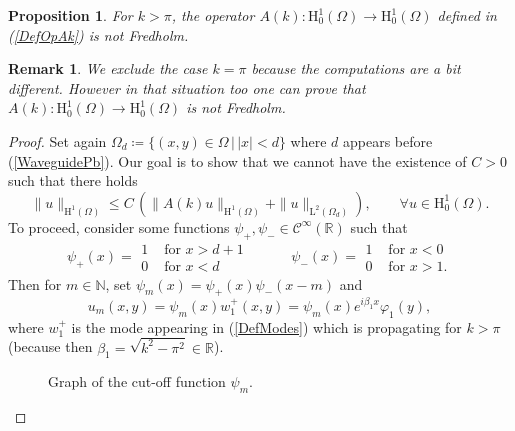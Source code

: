 \documentclass[11pt,a4paper]{report}
\newcommand{\Om}{\Omega}
\newcommand{\mrm}[1]{\mathrm{#1}}
\newcommand{\N}{\mathbb{N}}
\newcommand{\R}{\mathbb{R}}
\newcommand{\mL}{\mrm{L}}
\newcommand{\mH}{\mrm{H}}
\newtheorem{remark}[theorem]{Remark}
\newtheorem{proposition}[theorem]{Proposition}
\begin{document}
\begin{proposition}
For $k>\pi$, the operator $A(k):\mH^1_0(\Om)\to\mH^1_0(\Om)$  defined in (\ref{DefOpAk}) is not Fredholm.
\end{proposition}
\begin{remark}
We exclude the case $k=\pi$ because the computations are a bit different. However in that situation too one can prove that $A(k):\mH^1_0(\Om)\to\mH^1_0(\Om)$ is not Fredholm.
\end{remark}
\begin{proof}
Set again $\Om_d\coloneqq\{(x,y)\in\Om\,|\,|x|<d\}$ where $d$ appears before (\ref{WaveguidePb}). Our goal is to show that we cannot have the existence of $C>0$ such that there holds
\begin{equation}\label{EstimAP}
\|u\|_{\mH^1(\Om)}\le C\,(\|A(k)u\|_{\mH^1(\Om)}+\|u\|_{\mL^2(\Om_d)}),\qquad \forall u\in\mH^1_0(\Om).
\end{equation}
To proceed, consider some functions $\psi_+,\psi_-\in\mathscr{C}^\infty(\R)$ such that 
\[
\psi_+(x)=\begin{array}{|ll}
 1 & \mbox{ for }x> d+1 \\[2pt]
0 & \mbox{ for }x< d
\end{array}\qquad \quad\psi_-(x)=\begin{array}{|ll}
1 & \mbox{ for }x< 0\\[2pt]
0 & \mbox{ for }x>1.
\end{array}
\]
Then for $m\in\N$, set $\psi_m(x)=\psi_+(x)\psi_-(x-m)$ and 
\[
u_m(x,y)=\psi_m(x) w_1^+(x,y)=\psi_m(x) e^{i\beta_1 x}\varphi_1(y),
\]
where $w_1^+$ is the mode appearing in (\ref{DefModes}) which is propagating for $k>\pi$ (because then $\beta_1=\sqrt{k^2-\pi^2}\in\R$).


\begin{figure}[!ht]
\centering
{}
\caption{Graph of the cut-off function $\psi_m$.\label{CutOffFunction}} 
\end{figure}


\end{proof}
\end{document}
